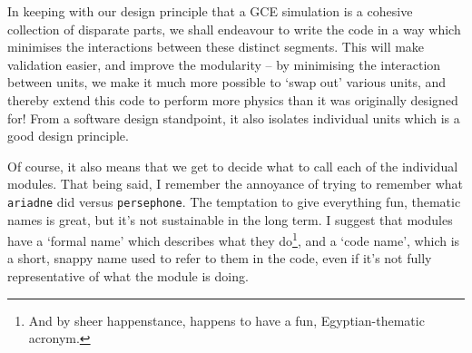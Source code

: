 \documentclass[a4paper,10pt]{article}
\begin{document}
			In keeping with our design principle that a GCE simulation is a cohesive collection of disparate parts, we shall endeavour to write the code in a way which minimises the interactions between these distinct segments. This will make validation easier, and improve the modularity -- by minimising the interaction between units, we make it much more possible to `swap out' various units, and thereby extend this code to perform more physics than it was originally designed for! From a software design standpoint, it also isolates individual units which is a good design principle.

			Of course, it also means that we get to decide what to call each of the individual modules. That being said, I remember the annoyance of trying to remember what \texttt{ariadne} did versus \texttt{persephone}. The temptation to give everything fun, thematic names is great, but it's not sustainable in the long term. I suggest that modules have a `formal name' which describes what they do\footnote{And by sheer happenstance, happens to have a fun, Egyptian-thematic acronym.}, and a `code name', which is a short, snappy name used to refer to them in the code, even if it's not fully representative of what the module is doing.
\end{document}
